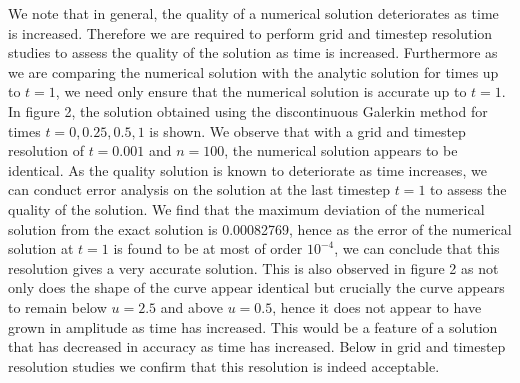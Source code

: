 \documentclass[a4paper, 12pt]{article}
\begin{document}
We note that in general, the quality of a numerical solution deteriorates as time is increased. Therefore we are required to perform grid and timestep resolution studies to assess the quality of the solution as time is increased. Furthermore as we are comparing the numerical solution with the analytic solution for times up to $t=1$, we need only ensure that the numerical solution is accurate up to $t=1$. In figure 2, the solution obtained using the discontinuous Galerkin method for times $t=0,0.25,0.5,1$ is shown. We observe that with a grid and timestep resolution of $t=0.001$ and $n=100$, the numerical solution appears to be identical. As the quality solution is known to deteriorate as time increases, we can conduct error analysis on the solution at the last timestep $t=1$ to assess the quality of the solution. We find that the maximum deviation of the numerical solution from the exact solution is 0.00082769, hence as the error of the numerical solution at $t=1$ is found to be at most of order $10^{-4}$, we can conclude that this resolution gives a very accurate solution. This is also observed in figure 2 as not only does the shape of the curve appear identical but crucially the curve appears to remain below $u=2.5$ and above $u=0.5$, hence it does not appear to have grown in amplitude as time has increased. This would be a feature of a solution that has decreased in accuracy as time has increased. Below in grid and timestep resolution studies we confirm that this resolution is indeed acceptable. \\   
\end{document}
